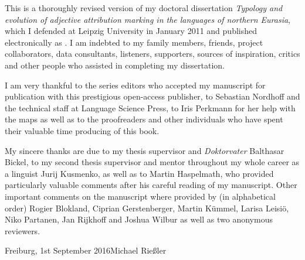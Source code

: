 

This is a thoroughly revised version of my doctoral dissertation \textit{Typology and evolution of adjective attribution marking in the languages of northern Eurasia}, which I defended at Leipzig University in January 2011 and published electronically as \citet{riesler2011a}. I am indebted to my family members, friends, project collaborators, data consultants, listeners, supporters, sources of inspiration, critics and other people who assisted in completing my dissertation. 

I am very thankful to the series editors who accepted my manuscript for publication with this prestigious open-access publisher, to Sebastian Nordhoff and the technical staff at Language Science Press, to Iris Perkmann for her help with the maps as well as to the proofreaders and other individuals who have spent their valuable time producing of this book. 

My sincere thanks are due to my thesis supervisor and \emph{Doktorvater} Balthasar Bickel, to my second thesis supervisor and mentor throughout my whole career as a linguist Jurij Kusmenko, as well as to Martin Haspelmath, who provided particularly valuable comments after his careful reading of my manuscript. Other important comments on the manuscript where provided by (in alphabetical order) Rogier Blokland, Ciprian Gerstenberger, Martin Kümmel, Larisa Leisiö, Niko Partanen, Jan Rijkhoff and Joshua Wilbur as well as two anonymous reviewers.

\bigskip

\noindent
Freiburg, 1st September 2016\hfill Michael Rießler
